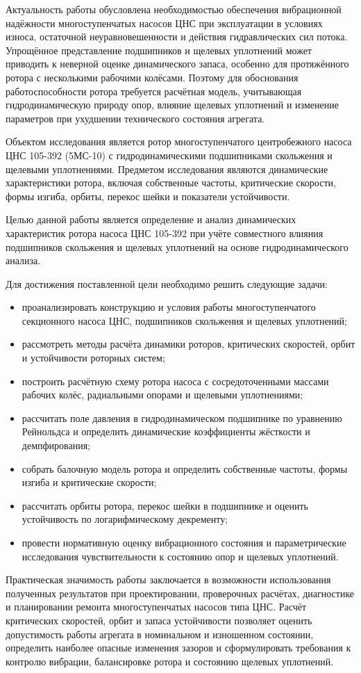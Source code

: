 Актуальность работы обусловлена необходимостью обеспечения вибрационной надёжности многоступенчатых насосов ЦНС при эксплуатации в условиях износа, остаточной неуравновешенности и действия гидравлических сил потока. Упрощённое представление подшипников и щелевых уплотнений может приводить к неверной оценке динамического запаса, особенно для протяжённого ротора с несколькими рабочими колёсами. Поэтому для обоснования работоспособности ротора требуется расчётная модель, учитывающая гидродинамическую природу опор, влияние щелевых уплотнений и изменение параметров при ухудшении технического состояния агрегата.

Объектом исследования является ротор многоступенчатого центробежного насоса ЦНС 105-392 (5МС-10) с гидродинамическими подшипниками скольжения и щелевыми уплотнениями. Предметом исследования являются динамические характеристики ротора, включая собственные частоты, критические скорости, формы изгиба, орбиты, перекос шейки и показатели устойчивости.

Целью данной работы является определение и анализ динамических характеристик ротора насоса ЦНС 105-392 при учёте совместного влияния подшипников скольжения и щелевых уплотнений на основе гидродинамического анализа.

Для достижения поставленной цели необходимо решить следующие задачи:
\begin{itemize}
    \item проанализировать конструкцию и условия работы многоступенчатого секционного насоса ЦНС, подшипников скольжения и щелевых уплотнений;
    \item рассмотреть методы расчёта динамики роторов, критических скоростей, орбит и устойчивости роторных систем;
    \item построить расчётную схему ротора насоса с сосредоточенными массами рабочих колёс, радиальными опорами и щелевыми уплотнениями;
    \item рассчитать поле давления в гидродинамическом подшипнике по уравнению Рейнольдса и определить динамические коэффициенты жёсткости и демпфирования;
    \item собрать балочную модель ротора и определить собственные частоты, формы изгиба и критические скорости;
    \item рассчитать орбиты ротора, перекос шейки в подшипнике и оценить устойчивость по логарифмическому декременту;
    \item провести нормативную оценку вибрационного состояния и параметрические исследования чувствительности к состоянию опор и щелевых уплотнений.
\end{itemize}

Практическая значимость работы заключается в возможности использования полученных результатов при проектировании, проверочных расчётах, диагностике и планировании ремонта многоступенчатых насосов типа ЦНС. Расчёт критических скоростей, орбит и запаса устойчивости позволяет оценить допустимость работы агрегата в номинальном и изношенном состоянии, определить наиболее опасные изменения зазоров и сформулировать требования к контролю вибрации, балансировке ротора и состоянию щелевых уплотнений.
